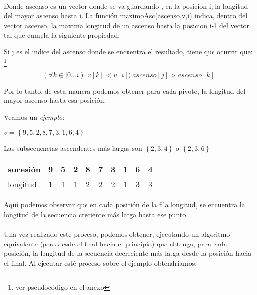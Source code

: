 	

\paragraph{}
Donde ascenso es un vector donde se va guardando , en la posicion i, la longitud del mayor ascenso hasta i. La función maximoAsc(ascenso,v,i) indica, dentro del vector ascenso, la maxima longitud de un ascenso hasta la posicion i-1 del vector tal que cumpla la siguiente propiedad:

\vspace*{1cm}

Si j es el indice del ascenso donde se encuentra el resultado, tiene que ocurrir que: \footnote{ver pseudocódigo en el anexo}

$$(\forall k \in [0...i) , v[k]<v[i]) \  ascenso[j] > ascenso[k]$$


Por lo tanto, de esta manera podemos obtener para cada pivote, la longitud del mayor ascenso hasta esa posición.

\vspace*{1cm}
Veamos un \textit{ejemplo}:

$v = \left\lbrace 9,5,2,8,7,3,1,6,4\right\rbrace$ 

Las subsecuencias ascendentes más largas son $\left\lbrace 2,3,4\right\rbrace$ o $\left\lbrace 2,3,6\right\rbrace$

\begin{center}
   \begin{tabular}{| l | c | c |c |c |c |c |c |c |c | }
     \hline
     sucesión & 9 & 5 & 2 & 8 & 7 & 3 & 1 & 6 & 4 \\ \hline
     longitud & 1& 1& 1& 2& 2& 2& 1 &3 & 3 \\ \hline
     
     \hline
   \end{tabular}
 \end{center}

Aquí podemos observar que en cada posición de la fila longitud, se encuentra la longitud de la secuencia creciente más larga hasta ese punto.

\paragraph{}
Una vez realizado este proceso, podemos obtener, ejecutando un algoritmo equivalente (pero desde el final hacia el principio) que obtenga, para cada posición, la longitud de la secuencia decreciente más larga desde la posición hacia el final. Al ejecutar esté proceso sobre el ejemplo obtendríamos:


